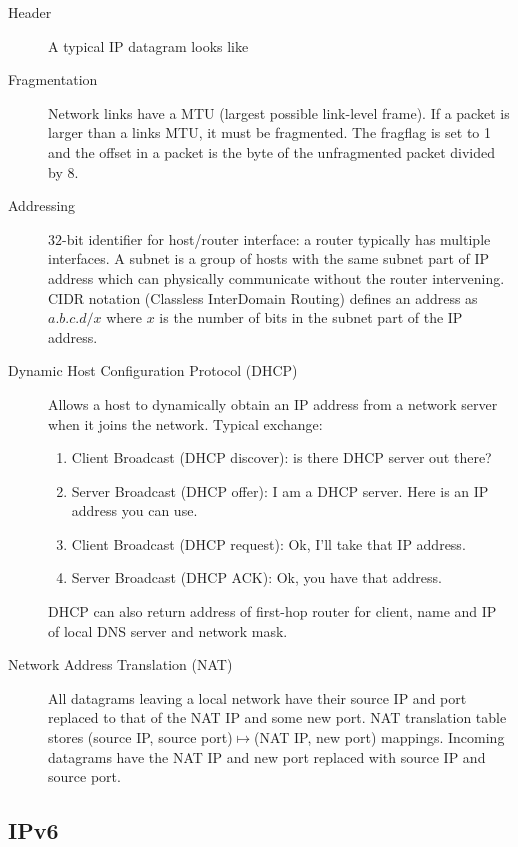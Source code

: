 \documentclass{article}
\begin{document}
\begin{description}
    \item[Header] A typical IP datagram looks like
    
    \item[Fragmentation] Network links have a MTU (largest possible link-level frame). If a packet is
    larger than a links MTU, it must be fragmented. The fragflag is set to 1 and the offset in a 
    packet is the byte of the unfragmented packet divided by $8$.
    
    \item[Addressing] $32$-bit identifier for host/router interface: a router typically has multiple
    interfaces. A subnet is a group of hosts with the same subnet part of IP address which can 
    physically communicate without the router intervening. CIDR notation (Classless InterDomain 
    Routing) defines an address as $a.b.c.d/x$ where $x$ is the number of bits in the subnet part of the
    IP address.
    
    \item[Dynamic Host Configuration Protocol (DHCP)] Allows a host to dynamically obtain an IP address
    from a network server when it joins the network. Typical exchange:
    \begin{enumerate}
        \item Client Broadcast (DHCP discover): is there DHCP server out there?
        \item Server Broadcast (DHCP offer): I am a DHCP server. Here is an IP address you can use.
        \item Client Broadcast (DHCP request): Ok, I'll take that IP address.
        \item Server Broadcast (DHCP ACK): Ok, you have that address.
    \end{enumerate}
    DHCP can also return address of first-hop router for client, name and IP of local DNS server
    and network mask.
    
    \item[Network Address Translation (NAT)] All datagrams leaving a local network have their source
    IP and port replaced to that of the NAT IP and some new port. NAT translation table stores
    (source IP, source port)$\mapsto$(NAT IP, new port) mappings. Incoming datagrams have the NAT IP
    and new port replaced with source IP and source port.
\end{description}

\subsection*{IPv6}
\end{document}
